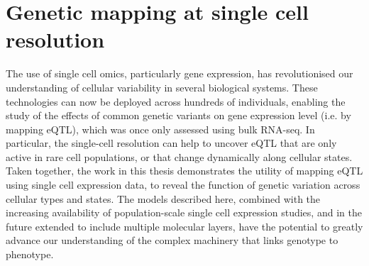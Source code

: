 \section{Genetic mapping at single cell resolution}

The use of single cell omics, particularly gene expression, has revolutionised our understanding of cellular variability in several biological systems.
These technologies can now be deployed across hundreds of individuals, enabling the study of the effects of common genetic variants on gene expression level (i.e. by mapping eQTL), which was once only assessed using bulk RNA-seq.
In particular, the single-cell resolution can help to uncover eQTL that are only active in rare cell populations, or that change dynamically along cellular states. 
Taken together, the work in this thesis demonstrates the utility of mapping eQTL using single cell expression data, to reveal the function of genetic variation across cellular types and states.
The models described here, combined with the increasing availability of population-scale single cell expression studies, and in the future extended to include multiple molecular layers, have the potential to greatly advance our understanding of the complex machinery that links genotype to phenotype. \\
